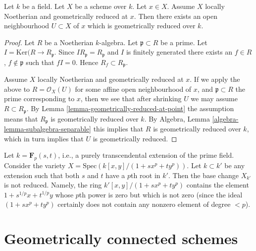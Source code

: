 \begin{lemma}
\label{lemma-Noetherian-geometrically-reduced-at-point}
Let $k$ be a field.
Let $X$ be a scheme over $k$.
Let $x \in X$.
Assume $X$ locally Noetherian and geometrically reduced at $x$.
Then there exists an open neighbourhood $U \subset X$ of $x$
which is geometrically reduced over $k$.
\end{lemma}

\begin{proof}
Let $R$ be a Noetherian $k$-algebra.
Let $\mathfrak p \subset R$ be a prime.
Let $I = \text{Ker}(R \to R_{\mathfrak p}$.
Since $IR_{\mathfrak p} = R_{\mathfrak p}$ and $I$ is finitely generated
there exists an $f \in R$, $f \not \in \mathfrak p$ such that $fI = 0$. 
Hence $R_f \subset R_{\mathfrak p}$.

\medskip\noindent
Assume $X$ locally Noetherian and geometrically reduced at $x$.
If we apply the above to $R = \mathcal{O}_X(U)$ for some affine
open neighbourhood of $x$, and $\mathfrak p \subset R$ the prime
corresponding to $x$, then we see that after shrinking $U$ we may
assume $R \subset R_{\mathfrak p}$. By
Lemma \ref{lemma-geometrically-reduced-at-point} the assumption
means that $R_{\mathfrak p}$ is geometrically reduced over $k$.
By Algebra, Lemma \ref{algebra-lemma-subalgebra-separable}
this implies that $R$ is geometrically reduced over $k$, which
in turn implies that $U$ is geometrically reduced.
\end{proof}

\begin{example}
\label{example-not-geometrically-reduced}
Let $k = \mathbf{F}_p(s, t)$, i.e., a purely transcendental extension
of the prime field. Consider the variety
$X = \text{Spec}(k[x, y]/(1 + sx^p + ty^p))$.
Let $k \subset k'$ be any extension such that
both $s$ and $t$ have a $p$th root in $k'$.
Then the base change $X_{k'}$ is not reduced.
Namely, the ring $k'[x, y]/(1 + s x^p + ty^p)$ contains the element
$1 + s^{1/p}x + t^{1/p}y$ whose $p$th power is zero but
which is not zero (since the ideal $(1 + sx^p + ty^p)$ certainly
does not contain any nonzero element of degree $< p$).
\end{example}






\section{Geometrically connected schemes}
\label{section-geometrically-connected}

